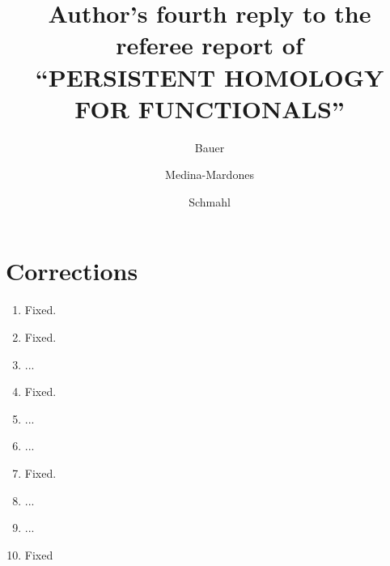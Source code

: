 \documentclass{article}
\title{Author's fourth reply to the referee report of \\ \textsc{
		``PERSISTENT HOMOLOGY FOR FUNCTIONALS''
	}
}
\author{Bauer \and Medina-Mardones \and Schmahl}
\begin{document}
	\maketitle

	\section*{Corrections}
	\begin{enumerate}
		\item Fixed.
		\item Fixed.
		\item ...
		\item Fixed.
		\item ...
		\item ...
		\item Fixed.
		\item ...
		\item ...
		\item Fixed
	\end{enumerate}
\end{document}
